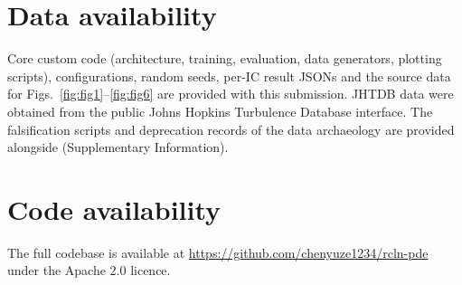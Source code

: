 \documentclass[11pt,a4paper]{article}
\begin{document}
\section*{Data availability}

Core custom code (architecture, training, evaluation, data generators, plotting scripts), configurations, random seeds, per-IC result JSONs and the source data for Figs.~\ref{fig:fig1}--\ref{fig:fig6} are provided with this submission. JHTDB data were obtained from the public Johns Hopkins Turbulence Database interface\cite{li2008jhtdb}. The falsification scripts and deprecation records of the data archaeology are provided alongside (Supplementary Information).

\section*{Code availability}

The full codebase is available at \url{https://github.com/chenyuze1234/rcln-pde} under the Apache 2.0 licence.
\end{document}
